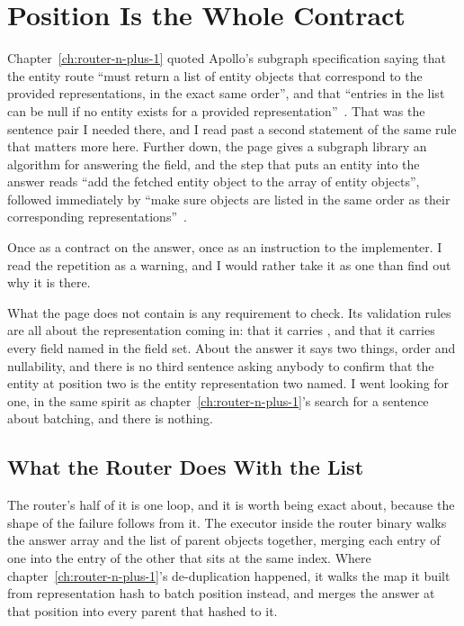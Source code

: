 \section{Position Is the Whole Contract}
\label{sec:ch11-position-is-the-whole-contract}

%
Chapter~\ref{ch:router-n-plus-1} quoted Apollo's subgraph specification saying
that the entity route
\enquote{must return a list of entity objects that correspond to the provided
representations, in the exact same order}, and that
\enquote{entries in the list can be null if no entity exists for a provided
representation}~\autocite{apollosubgraphspec}. That was the sentence pair I
needed there, and I read past a second statement of the same rule that matters
more here. Further down, the page gives a subgraph library an algorithm for
answering the field, and the step that puts an entity into the answer reads
\enquote{add the fetched entity object to the array of entity objects}, followed
immediately by \enquote{make sure objects are listed in the same order as their
corresponding representations}~\autocite{apollosubgraphspec}.

%
Once as a contract on the answer, once as an instruction to the implementer.
I read the repetition as a warning, and I would rather take it as one than
find out why it is there.

%
What the page does not contain is any requirement to check. Its validation
rules are all about the representation coming in: that it carries
, and that it carries every field named in the
 field set. About the answer it says two things, order and
nullability, and there is no third sentence asking anybody to confirm that the
entity at position two is the entity representation two named. I went looking
for one, in the same spirit as chapter~\ref{ch:router-n-plus-1}'s search for a
sentence about batching, and there is nothing.

\subsection{What the Router Does With the List}

%
The router's half of it is one loop, and it is worth being exact about,
because the shape of the failure follows from it. The executor inside the
router binary walks the answer array and the list of parent objects together,
merging each entry of one into the entry of the other that sits at the same
index. Where
chapter~\ref{ch:router-n-plus-1}'s de-duplication happened, it walks the map it
built from representation hash to batch position instead, and merges the answer
at that position into every parent that hashed to it.


